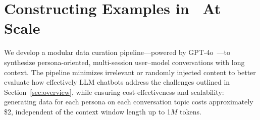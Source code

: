 \section{Constructing Examples in \datasetnameemoji~At Scale}
\label{sec:curation}
We develop a modular data curation pipeline—powered by GPT-4o~\citep{hurst2024gpt}—to synthesize persona-oriented, multi-session user–model conversations with long context. The pipeline minimizes irrelevant or randomly injected content to better evaluate how effectively LLM chatbots address the challenges outlined in Section~\ref{sec:overview}, while ensuring cost-effectiveness and scalability: generating data for each persona on each conversation topic costs approximately \$2, independent of the context window length up to 1$M$ tokens.













